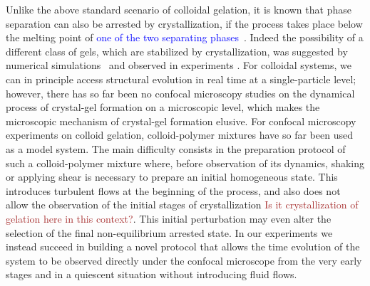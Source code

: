 \documentclass[preprint,amsmath,amssymb,superscriptaddress]{revtex4-1}
\begin{document}
Unlike the above standard scenario of colloidal gelation, it is known that phase separation can also be arrested by crystallization, if the process takes place below the melting point of \textcolor{blue}{one of the two separating phases}~\cite{tanaka1985new}. Indeed the possibility of a different class of gels, which are stabilized by crystallization, 
was suggested by numerical simulations~\cite{soga1999metastable,fortini2008crystallization,perez2011pathways} and observed in experiments \cite{sabin2012,zhang2012non}. 
For colloidal systems, we can in principle access structural evolution in real time at a single-particle level; however, there has so far been no confocal microscopy  
studies on the dynamical process of crystal-gel formation on a microscopic level, which makes the microscopic mechanism of crystal-gel formation elusive. 
For confocal microscopy experiments on colloid gelation, colloid-polymer mixtures have so far been used as a model system. 
The main difficulty consists in the preparation protocol of such a colloid-polymer mixture where, before observation of its dynamics, shaking or applying shear is necessary to prepare an initial homogeneous state. This introduces turbulent flows at the beginning of the process, and also does not allow the
observation of the initial stages of crystallization \textcolor{brown}{Is it crystallization of gelation here in this context?}. This initial perturbation may even alter the selection of the final non-equilibrium arrested state.  
In our experiments we instead succeed in building a novel protocol that allows the time evolution of the system to be observed directly
under the confocal microscope from the very early stages and in a quiescent situation without introducing fluid flows. 
\end{document}
